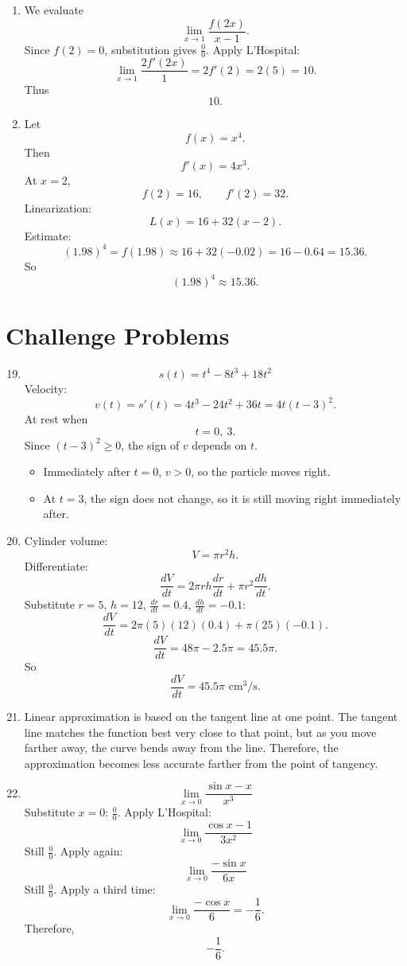 \documentclass[11pt]{article}
\begin{document}
\begin{enumerate}
    \item 
    We evaluate
    \[
    \lim_{x\to 1}\frac{f(2x)}{x-1}.
    \]
    Since \(f(2)=0\), substitution gives \(\frac00\). Apply L'Hospital:
    \[
    \lim_{x\to1}\frac{2f'(2x)}{1}=2f'(2)=2(5)=10.
    \]
    Thus
    \[
    \boxed{10}.
    \]

    \item 
    Let
    \[
    f(x)=x^4.
    \]
    Then
    \[
    f'(x)=4x^3.
    \]
    At \(x=2\),
    \[
    f(2)=16,\qquad f'(2)=32.
    \]
    Linearization:
    \[
    L(x)=16+32(x-2).
    \]
    Estimate:
    \[
    (1.98)^4=f(1.98)\approx 16+32(-0.02)=16-0.64=15.36.
    \]
    So
    \[
    \boxed{(1.98)^4\approx 15.36.}
    \]
\end{enumerate}

\bigskip

\section*{Challenge Problems}

\begin{enumerate}
    \setcounter{enumi}{18}

    \item 
    \[
    s(t)=t^4-8t^3+18t^2
    \]
    Velocity:
    \[
    v(t)=s'(t)=4t^3-24t^2+36t=4t(t-3)^2.
    \]
    At rest when
    \[
    t=0,\ 3.
    \]
    Since \((t-3)^2\ge 0\), the sign of \(v\) depends on \(t\).
    \begin{itemize}
        \item Immediately after \(t=0\), \(v>0\), so the particle moves right.
        \item At \(t=3\), the sign does not change, so it is still moving right immediately after.
    \end{itemize}

    \item 
    Cylinder volume:
    \[
    V=\pi r^2h.
    \]
    Differentiate:
    \[
    \frac{dV}{dt}=2\pi rh\frac{dr}{dt}+\pi r^2\frac{dh}{dt}.
    \]
    Substitute \(r=5\), \(h=12\), \(\frac{dr}{dt}=0.4\), \(\frac{dh}{dt}=-0.1\):
    \[
    \frac{dV}{dt}=2\pi(5)(12)(0.4)+\pi(25)(-0.1).
    \]
    \[
    \frac{dV}{dt}=48\pi-2.5\pi=45.5\pi.
    \]
    So
    \[
    \boxed{\frac{dV}{dt}=45.5\pi\text{ cm}^3/\text{s}.}
    \]

    \item 
    Linear approximation is based on the tangent line at one point. The tangent line matches the function best very close to that point, but as you move farther away, the curve bends away from the line. Therefore, the approximation becomes less accurate farther from the point of tangency.

    \item 
    \[
    \lim_{x\to 0}\frac{\sin x-x}{x^3}
    \]
    Substitute \(x=0\): \(\frac00\). Apply L'Hospital:
    \[
    \lim_{x\to0}\frac{\cos x-1}{3x^2}
    \]
    Still \(\frac00\). Apply again:
    \[
    \lim_{x\to0}\frac{-\sin x}{6x}
    \]
    Still \(\frac00\). Apply a third time:
    \[
    \lim_{x\to0}\frac{-\cos x}{6}=-\frac16.
    \]
    Therefore,
    \[
    \boxed{-\frac16}.
    \]
\end{enumerate}
\end{document}
